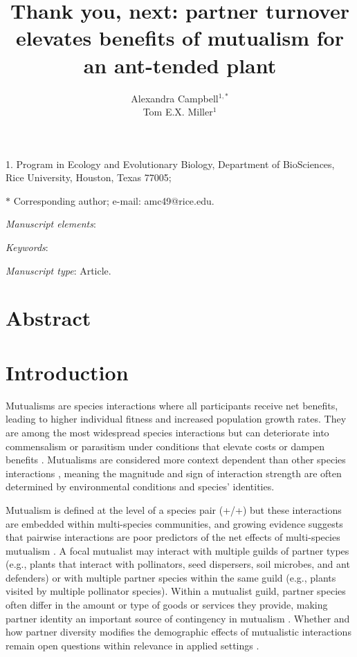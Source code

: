 \documentclass[11pt]{article}
\title{Thank you, next: partner turnover elevates benefits of mutualism for an ant-tended plant}
\author{Alexandra Campbell$^{1,\ast}$ \\ 
	Tom E.X. Miller$^{1}$}
\date{}
\begin{document}
	
	\maketitle
	
	\noindent{} 1. Program in Ecology and Evolutionary Biology, Department of BioSciences, Rice University, Houston, Texas 77005;
	
	\noindent{} $\ast$ Corresponding author; e-mail: amc49@rice.edu.
	
	
	\textit{Manuscript elements}: 
	
	\bigskip
	
	\textit{Keywords}: 
	
	\bigskip
	
	\textit{Manuscript type}: Article.
	
	\bigskip
	
	
\linenumbers{}
\modulolinenumbers[3]

\newpage{}

\section*{Abstract}


\newpage{}
\section*{Introduction}
Mutualisms are species interactions where all participants receive net benefits, leading to higher individual fitness and increased population growth rates. 
They are among the most widespread species interactions \citep{Bronstein1994,Chamberlain2014,Frederickson2013} but can deteriorate into commensalism or parasitism under conditions that elevate costs or dampen benefits \citep{Rodriguez-Rodriguez2017,Song2020,Mandyam2014,Thrall2007, Bahia2022}.
Mutualisms are considered more context dependent than other species interactions \citep{Chamberlain2014,Frederickson2013}, meaning the magnitude and sign of interaction strength are often determined by environmental conditions and species' identities.

Mutualism is defined at the level of a species pair (+/+) but these interactions are embedded within multi-species communities, and growing evidence suggests that pairwise interactions are poor predictors of the net effects of multi-species mutualism \citep{Afkhami2014,Palmer2010}. 
A focal mutualist may interact with multiple guilds of partner types (e.g., plants that interact with pollinators, seed dispersers, soil microbes, and ant defenders) or with multiple partner species within the same guild (e.g., plants visited by multiple pollinator species). 
Within a mutualist guild, partner species often differ in the amount or type of goods or services they provide, making partner identity an important source of contingency in mutualism \citep{Stanton2003}. 
Whether and how partner diversity modifies the demographic effects of mutualistic interactions remain open questions within relevance in applied settings \citep{rogers2014}. 
\end{document}
